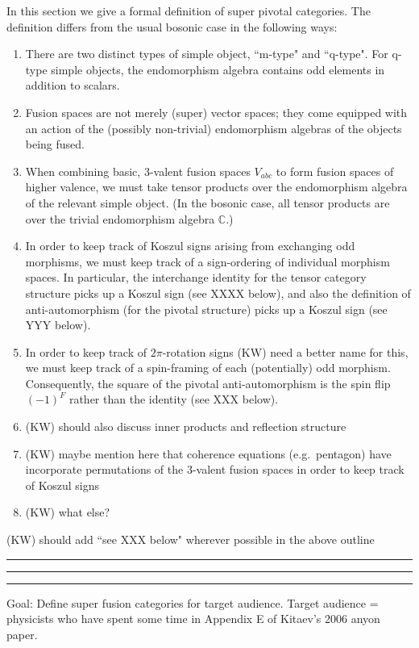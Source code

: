 \documentclass[12pt,a4paper]{article}
\newcommand{\cc}{\mathbb{C}}
\newcommand{\kw}[1]{{\color{kwcolor}\footnotesize{(KW) #1}}}
\newcommand{\kwsep}{\bigskip\hrule\medskip\hrule\medskip\hrule\bigskip}
\begin{document}
In this section we give a formal definition of super pivotal categories.
The definition differs from the usual bosonic case in the following ways:
\begin{enumerate}
	\item There are two distinct types of simple object, ``m-type" and ``q-type".
	For q-type simple objects, the endomorphism algebra contains odd elements in addition to scalars.
	\item Fusion spaces are not merely (super) vector spaces; they come equipped with an action of the (possibly non-trivial)
	endomorphism algebras of the objects being fused.
	\item When combining basic, 3-valent fusion spaces $V_{abc}$ to form fusion spaces of higher valence, we must take
	tensor products over the endomorphism algebra of the relevant simple object.
	(In the bosonic case, all tensor products are over the trivial endomorphism algebra $\cc$.)
	\item In order to keep track of Koszul signs arising from exchanging odd morphisms, 
	we must keep track of a sign-ordering of individual morphism spaces.
	In particular, the interchange identity for the tensor category structure picks up a Koszul sign (see XXXX below),
	and also the definition of anti-automorphism (for the pivotal structure) picks up a Koszul sign (see YYY below).
	\item In order to keep track of $2\pi$-rotation signs
	\kw{need a better name for this}, we must keep track of a spin-framing of each (potentially) odd morphism.
	Consequently, the square of the pivotal anti-automorphism is 
	the spin flip $(-1)^F$ rather than the identity (see XXX below).
	\item \kw{should also discuss inner products and reflection structure}
	\item \kw{maybe mention here that coherence equations (e.g.\ pentagon) have incorporate permutations of the 
	3-valent fusion spaces in order to keep track of Koszul signs}
	\item \kw{what else?}
	
\end{enumerate}

\kw{should add ``see XXX below" wherever possible in the above outline}

\kwsep 
 
Goal: Define super fusion categories for target audience. Target audience = physicists who have spent some time in Appendix E of Kitaev's 2006 anyon paper. 
\end{document}
